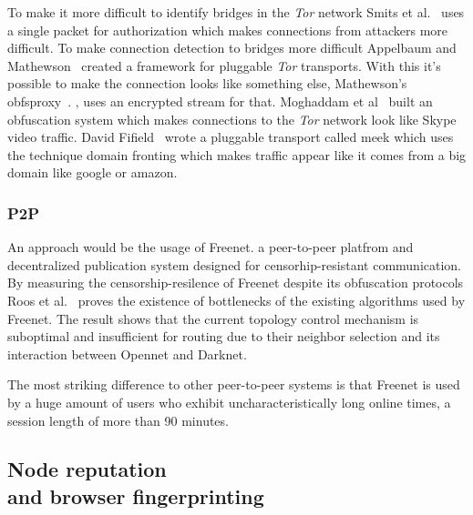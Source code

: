 \documentclass{sig-alternate}
\begin{document}
 To make it more difficult to identify bridges in the \textit{Tor} network Smits et al.~\cite{smits2011bridgespa}
uses a single packet for authorization which makes connections from attackers more difficult. 
To make connection detection to bridges more difficult Appelbaum and Mathewson~\cite{appelbaum2010pluggable} created a framework for pluggable \textit{Tor} transports. With this it's possible to make the connection looks like something else, Mathewson's obfsproxy~\cite{gitlink}.
‚
uses an encrypted stream for that. Moghaddam et al~\cite{mohajeri2012skypemorph} built an obfuscation system which makes connections to the \textit{Tor} network look like Skype video traffic. David Fifield~\cite{pluggableTransport} wrote a pluggable transport called meek which uses the technique domain fronting which makes traffic appear like it comes from a big domain like google or amazon.

\subsubsection{P2P}
An approach would be the usage of Freenet. a peer-to-peer platfrom and decentralized publication system designed for censorhip-resistant communication. By measuring the censorship-resilence of Freenet despite its obfuscation protocols Roos et al.~\cite{roos2014measuring} proves the existence of bottlenecks of the existing algorithms used by Freenet. The result shows that the current topology control mechanism is suboptimal and insufficient for routing due to their neighbor selection and its interaction between Opennet and Darknet.

The most striking difference to other peer-to-peer systems is that Freenet is used by a huge amount of users who exhibit uncharacteristically long online times, a session length of more than 90 minutes.

\subsection{Node reputation \\and browser fingerprinting}
\end{document}
